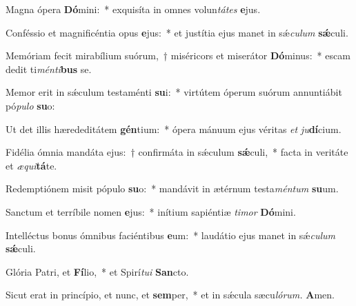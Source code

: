 \item Magna ópera \textbf{Dó}mini:~* exquisíta in omnes volun\hspace{0.03em}\textit{tátes} \textbf{e}jus.
\item Conféssio et magnificéntia opus \textbf{e}jus:~* et justítia ejus manet in sǽ\hspace*{0.03em}\textit{culum} \textbf{sǽ}culi.
\item Memóriam fecit mirabílium suórum,~† miséricors et miserátor \textbf{Dó}minus:~* escam dedit ti\textit{ménti}\textbf{bus} se.
\item Memor erit in sǽculum testaménti \textbf{su}i:~* virtútem óperum suórum annuntiábit pó\textit{pulo} \textbf{su}o:
\item Ut det illis hærededitátem \textbf{gén}tium:~* ópera mánuum ejus véritas \textit{et} \textit{ju}\textbf{dí}cium.
\item Fidélia ómnia mandáta ejus:~† confirmáta in sǽculum \textbf{sǽ}culi,~* facta in veritáte et \textit{æqui}\textbf{tá}te.
\item Redemptiónem misit pópulo \textbf{su}o:~* mandávit in ætérnum testa\hspace{0.03em}\textit{méntum} \textbf{su}um.
\item Sanctum et terríbile nomen \textbf{e}jus:~* inítium sapiéntiæ \textit{timor} \textbf{Dó}mini.
\item Intelléctus bonus ómnibus faciéntibus \textbf{e}um:~* laudátio ejus manet in sǽ\hspace*{0.03em}\textit{culum} \textbf{sǽ}culi.
\item Glória Patri, et \textbf{Fí}lio,~* et Spirí\hspace{0.03em}\textit{tui} \textbf{San}cto.
\item Sicut erat in princípio, et nunc, et \textbf{sem}per,~* et in sǽcula sæcu\hspace{0.03em}\textit{lórum.} \textbf{A}men.